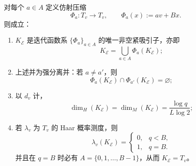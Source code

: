 \begin{theorem}\label{thm:killo-2adic-holographic-attractor-dimension}
对每个 \(a\in A\) 定义仿射压缩
\[
\Phi_a:T_v\to T_v,\qquad \Phi_a(x):=av+Bx.
\]
则成立：
\begin{enumerate}
  \item \(K_{\mathcal E}\) 是迭代函数系 \(\{\Phi_a\}_{a\in A}\) 的唯一非空紧吸引子，亦即
  \[
  K_{\mathcal E}=\bigcup_{a\in A}\Phi_a(K_{\mathcal E});
  \]
  \item 上述并为强分离并：若 \(a\neq a'\)，则
  \[
  \Phi_a(K_{\mathcal E})\cap \Phi_{a'}(K_{\mathcal E})=\varnothing;
  \]
  \item 以 \(d_v\) 计，
  \[
  \dim_H(K_{\mathcal E})=\dim_M(K_{\mathcal E})=\frac{\log q}{L\log 2};
  \]
  \item 若 \(\lambda_v\) 为 \(T_v\) 的 Haar 概率测度，则
  \[
  \lambda_v(K_{\mathcal E})=
  \begin{cases}
  0,& q<B,\\
  1,& q=B.
  \end{cases}
  \]
  并且在 \(q=B\) 时必有 \(A=\{0,1,\dots,B-1\}\)，从而 \(K_{\mathcal E}=T_v\)。
\end{enumerate}
\end{theorem}
